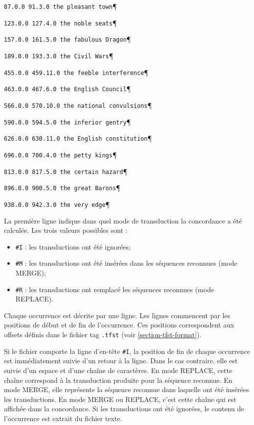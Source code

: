 \verb$87.0.0 91.3.0 the pleasant town$\P

\verb$123.0.0 127.4.0 the noble seats$\P

\verb$157.0.0 161.5.0 the fabulous Dragon$\P

\verb$189.0.0 193.3.0 the Civil Wars$\P

\verb$455.0.0 459.11.0 the feeble interference$\P

\verb$463.0.0 467.6.0 the English Council$\P

\verb$566.0.0 570.10.0 the national convulsions$\P

\verb$590.0.0 594.5.0 the inferior gentry$\P

\verb$626.0.0 630.11.0 the English constitution$\P

\verb$696.0.0 700.4.0 the petty kings$\P

\verb$813.0.0 817.5.0 the certain hazard$\P

\verb$896.0.0 900.5.0 the great Barons$\P

\verb$938.0.0 942.3.0 the very edge$\P

\bigskip
\noindent La première ligne indique dans quel mode de transduction la concordance a été calculée.
Les trois valeurs possibles sont :

\begin{itemize}
  \item \verb+#I+ : les transductions ont été ignorées;

  \item \verb+#M+ : les transductions ont été insérées dans les séquences reconnues (mode MERGE);
  
  \item \verb+#R+ : les transductions ont remplacé les séquences reconnues (mode REPLACE).
\end{itemize}

\bigskip
\noindent Chaque occurrence est décrite par une ligne. Les lignes commencent par les positions de
début et de fin de l’occurrence. Ces positions correspondent aux offsets
définis dans le fichier tag \verb$.tfst$  (voir \ref{section-tfst-format}).

\bigskip
\noindent Si le fichier comporte la ligne d’en-tête \verb+#I+, la position de fin de chaque
occurrence est immédiatement suivie d’un retour à la ligne. Dans le cas contraire, elle est suivie
d’un espace et d’une chaîne de caractères. En mode REPLACE, cette chaîne correspond à la
transduction produite pour la séquence reconnue. En mode MERGE, elle représente la séquence reconnue
dans laquelle ont été insérées les transductions. En mode MERGE ou REPLACE, c’est cette chaîne qui
est affichée dans la concordance. Si les transductions ont été ignorées, le contenu de l’occurrence
est extrait du fichier texte.



